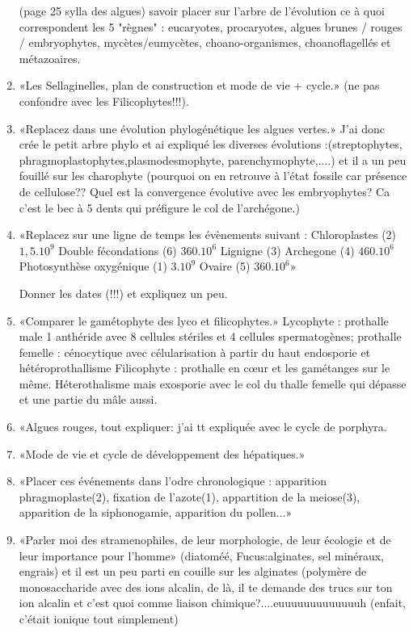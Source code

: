 \begin{enumerate}
(page 25 sylla des algues) savoir placer sur l'arbre de l'évolution ce à quoi correspondent les 5 "règnes" : eucaryotes, procaryotes, algues brunes / rouges / embryophytes, mycètes/eumycètes, choano-organismes, choanoflagellés et métazoaires.

	\item «Les Sellaginelles, plan de construction et mode de vie + cycle.» (ne pas confondre avec les Filicophytes!!!).

	\item «Replacez dans une évolution phylogénétique les algues vertes.» J'ai donc crée le petit arbre phylo et ai expliqué les diverses évolutions :(streptophytes, phragmoplastophytes,plasmodesmophyte, parenchymophyte,....) et il a un peu fouillé sur les charophyte (pourquoi on en retrouve à l'état fossile car présence de cellulose?? Quel est la convergence évolutive avec les embryophytes? Ca c'est le bec à 5 dents qui préfigure le col de l'archégone.)

	\item «Replacez sur une ligne de temps les évènements suivant :
Chloroplastes (2) $1,5.10^9$
Double fécondations (6) $360.10^6$
Lignigne (3)
Archegone (4) $460.10^6$
Photosynthèse oxygénique (1) $3 .10^9$
Ovaire (5) $360.10^6$»

Donner les dates (!!!) et expliquez un peu.

	\item «Comparer le gamétophyte des lyco et filicophytes.»
Lycophyte : prothalle male 1 anthéride avec 8 cellules stériles et 4 cellules spermatogènes; prothalle femelle : cénocytique avec célularisation à partir du haut endosporie et hétéroprothallisme
Filicophyte : prothalle en cœur et les gamétanges sur le même. Héterothalisme mais exosporie avec le col du thalle femelle qui dépasse et une partie du mâle aussi.

	\item «Algues rouges, tout expliquer: j’ai tt expliquée avec le cycle de porphyra.

	\item «Mode de vie et cycle de développement des hépatiques.»

	\item «Placer ces événements dans l'odre chronologique : apparition phragmoplaste(2), fixation de l'azote(1), appartition de la meiose(3), apparition de la siphonogamie, apparition du pollen...»


	\item «Parler moi des stramenophiles, de leur morphologie, de leur écologie et de leur importance pour l'homme» (diatoméé, Fucus:alginates, sel minéraux, engrais) et il est un peu parti en couille sur les alginates (polymère de monosaccharide avec des ions alcalin, de là, il te demande des trucs sur ton ion alcalin et c'est quoi comme liaison chimique?....euuuuuuuuuuuuuh (enfait, c'était ionique tout simplement)


\end{enumerate}
